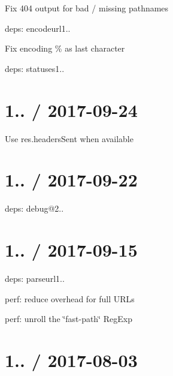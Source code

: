 
\begin{DoxyItemize}
\item Fix 404 output for bad / missing pathnames
\item deps\+: encodeurl1..
\begin{DoxyItemize}
\item Fix encoding {\ttfamily \%} as last character
\end{DoxyItemize}
\item deps\+: statuses1..
\end{DoxyItemize}

\section*{1.. / 2017-\/09-\/24 }


\begin{DoxyItemize}
\item Use {\ttfamily res.\+headers\+Sent} when available
\end{DoxyItemize}

\section*{1.. / 2017-\/09-\/22 }


\begin{DoxyItemize}
\item deps\+: debug@2..
\end{DoxyItemize}

\section*{1.. / 2017-\/09-\/15 }


\begin{DoxyItemize}
\item deps\+: parseurl1..
\begin{DoxyItemize}
\item perf\+: reduce overhead for full U\+R\+Ls
\item perf\+: unroll the \char`\"{}fast-\/path\char`\"{} {\ttfamily Reg\+Exp}
\end{DoxyItemize}
\end{DoxyItemize}

\section*{1.. / 2017-\/08-\/03 }


